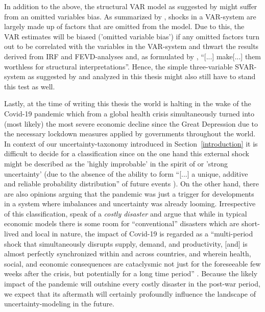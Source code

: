 \documentclass[a4paper,11pt,listof=nochaptergap,oneside,pointednumbers,bibtotoc,bigheadings,liststotoc,hidelinks]{scrbook}
\theoremstyle{mysatz}
\theoremstyle{mydefinition}
\theoremstyle{mytheorem}
\theoremstyle{mybemerkung}
\begin{document}
In addition to the above, the structural VAR model as suggested by \citet{ludvigsonetal:19} might suffer from an omitted variables bias. As summarized by \citet{stockwatson:01}, shocks in a VAR-system are largely made up of factors that are omitted from the model. Due to this, the VAR estimates will be biased ('omitted variable bias') if any omitted factors turn out to be correlated with the variables in the VAR-system and thwart the results derived from IRF and FEVD-analyses and, as formulated by \citet[p. 62]{lutkepohl:05}, ``[...] make[...] them worthless for structural interpretations''. Hence, the simple three-variable SVAR-system as suggested by \citet{ludvigsonetal:19} and analyzed in this thesis might also still have to stand this test as well.

Lastly, at the time of writing this thesis the world is halting in the wake of the Covid-19 pandemic which from a global health crisis simultaneously turned into (most likely) the most severe economic decline since the Great Depression due to the necessary lockdown measures applied by governments throughout the world. In context of our uncertainty-taxonomy introduced in Section~\ref{introduction} it is difficult to decide for a classification since on the one hand this external shock might be described as the 'highly improbable' in the spirit of \citet{taleb:08} or 'strong uncertainty' (due to the absence of the ability to form ``[...] a unique, additive and reliable probability distribution'' of future events \citep[p. 622/623]{dequech:14}). On the other hand, there are also opinions arguing that the pandemic was just a trigger for developments in a system where imbalances and uncertainty was already looming. Irrespective of this classification, \citet{ludvigsonetal:20} speak of a \textit{costly disaster} and argue that while in typical economic models there is some room for ``conventional'' disasters \citep[p. 2]{ludvigsonetal:20} which are short-lived and local in nature, the impact of Covid-19 is regarded as a ``multi-period shock that simultaneously disrupts supply, demand, and productivity, [and] is almost perfectly synchronized within and across countries, and wherein health, social, and economic consequences are cataclysmic not just for the foreseeable few weeks after the crisis, but potentially for a long time period'' \citet[p. 2]{ludvigsonetal:20}. Because the likely impact of the pandemic will outshine every costly disaster in the post-war period, we expect that its aftermath will certainly profoundly influence the landscape of uncertainty-modeling in the future.
\end{document}
